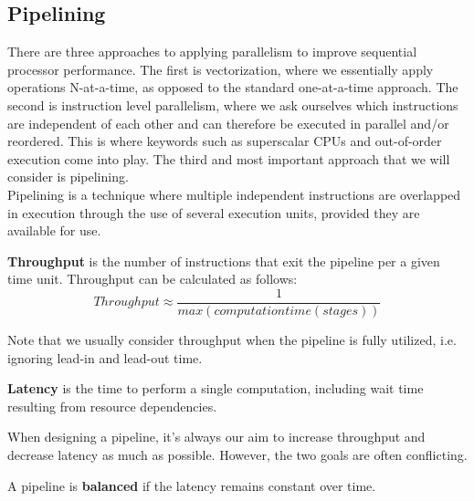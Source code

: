 \documentclass[main.tex]{subfiles}
\begin{document}
\subsection{Pipelining} \label{Pipelining}
There are three approaches to applying parallelism to improve sequential processor performance. The first is vectorization, where we essentially apply operations N-at-a-time, as opposed to the standard one-at-a-time approach. The second is instruction level parallelism, where we ask ourselves which instructions are independent of each other and can therefore be executed in parallel and/or reordered. This is where keywords such as superscalar CPUs and out-of-order execution come into play. The third and most important approach that we will consider is pipelining. \\[3mm]
Pipelining is a technique where multiple independent instructions are overlapped in execution through the use of several execution units, provided they are available for use.
\begin{definition}
    \textbf{Throughput} is the number of instructions that exit the pipeline per a given time unit. Throughput can be calculated as follows:
    \begin{equation*}
        Throughput \approx \frac{1}{max(computationtime(stages))}
    \end{equation*}
\end{definition}
Note that we usually consider throughput when the pipeline is fully utilized, i.e. ignoring lead-in and lead-out time.
\begin{definition}
    \textbf{Latency} is the time to perform a single computation, including wait time resulting from resource dependencies.
\end{definition}
When designing a pipeline, it's always our aim to increase throughput and decrease latency as much as possible. However, the two goals are often conflicting.
\begin{definition}
    A pipeline is \textbf{balanced} if the latency remains constant over time.
\end{definition}
\end{document}
